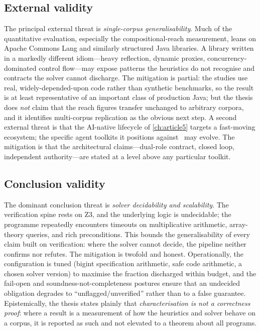\subsection{External validity}

The principal external threat is \emph{single-corpus generalisability}. Much of the
quantitative evaluation, especially the compositional-reach measurement, leans on
Apache Commons Lang and similarly structured Java libraries. A library written in a
markedly different idiom---heavy reflection, dynamic proxies, concurrency-dominated
control flow---may expose patterns the heuristics do not recognise and contracts the
solver cannot discharge. The mitigation is partial: the studies use real,
widely-depended-upon code rather than synthetic benchmarks, so the result is at
least representative of an important class of production Java; but the thesis does
\emph{not} claim that the reach figures transfer unchanged to arbitrary corpora, and
it identifies multi-corpus replication as the obvious next step. A second external
threat is that the AI-native lifecycle of \cref{ch:article5} targets a fast-moving
ecosystem; the specific agent toolkits it positions against~\citep{githubspeckit,awskiro,awsaidlc}
may evolve. The mitigation is that the architectural claims---dual-role contract,
closed loop, independent authority---are stated at a level above any particular
toolkit.

\subsection{Conclusion validity}

The dominant conclusion threat is \emph{solver decidability and scalability}. The
verification spine rests on Z3, and the underlying logic is undecidable; the
programme repeatedly encounters timeouts on multiplicative arithmetic, array-theory
queries, and rich preconditions. This bounds the generalisability of every claim
built on verification: where the solver cannot decide, the pipeline neither
confirms nor refutes. The mitigation is twofold and honest. Operationally, the
configuration is tuned (bigint specification arithmetic, safe code arithmetic, a
chosen solver version) to maximise the fraction discharged within budget, and the
fail-open and soundness-not-completeness postures ensure that an undecided
obligation degrades to ``unflagged/unverified'' rather than to a false guarantee.
Epistemically, the thesis states plainly that \emph{characterisation is not a
correctness proof}: where a result is a measurement of how the heuristics and
solver behave on a corpus, it is reported as such and not elevated to a theorem
about all programs.

